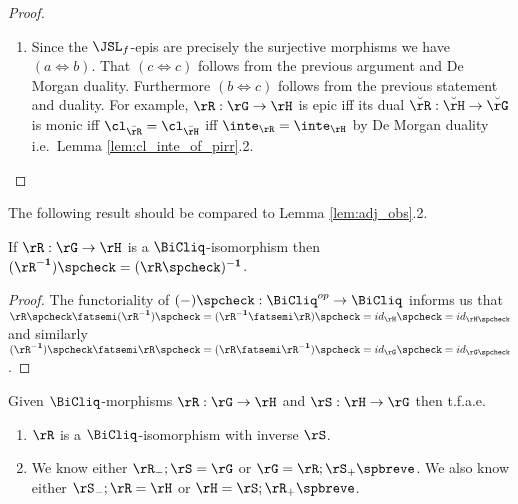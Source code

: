 \documentclass{article}
\begin{document}
\begin{proof}
\begin{enumerate}
\item
Since the $\JSL_f$-epis are precisely the surjective morphisms we have $(a \iff b)$. That $(c \iff c)$ follows from the previous argument and De Morgan duality. Furthermore $(b \iff c)$ follows from the previous statement and duality. For example, $\rR : \rG \to \rH$ is epic iff its dual $\breve{\rR} : \breve{\rH} \to \breve{\rG}$ is monic iff $\cl_{\breve{\rR}} = \cl_{\breve{\rH}}$ iff $\inte_\rR = \inte_\rH$ by De Morgan duality i.e.\ Lemma \ref{lem:cl_inte_of_pirr}.2.
\end{enumerate}
\end{proof}

The following result should be compared to Lemma \ref{lem:adj_obs}.2.

\begin{lemma}
\label{lem:bicliq_iso_adj_inverse_commutes}
If $\rR : \rG \to \rH$ is a $\BiCliq$-isomorphism then $(\rR^{\bf-1})\spcheck = (\rR\spcheck)^{\bf-1}$.
\end{lemma}

\begin{proof}
The functoriality of $(-)\spcheck : \BiCliq^{op} \to \BiCliq$ informs us that $\rR\spcheck \fatsemi (\rR^{\bf-1})\spcheck = (\rR^{\bf-1} \fatsemi \rR)\spcheck = id_\rH\spcheck = id_{\rH\spcheck}$ and similarly $(\rR^{\bf-1})\spcheck \fatsemi \rR\spcheck = (\rR \fatsemi \rR^{\bf-1})\spcheck = id_\rG\spcheck = id_{\rG\spcheck}$.
\end{proof}

\smallskip

\begin{lemma}
\label{lem:bicliq_iso_two_mor}
\item
Given $\BiCliq$-morphisms $\rR : \rG \to \rH$ and $\rS : \rH \to \rG$ then t.f.a.e.\
\begin{enumerate}
\item
$\rR$ is a $\BiCliq$-isomorphism with inverse $\rS$.
\item
We know either $\rR_- ; \rS = \rG$ or $\rG = \rR ; \rS_+\spbreve$.
We also know either $\rS_- ; \rR = \rH$ or  $\rH = \rS ; \rR_+\spbreve$.
\end{enumerate}
\end{lemma}
\end{document}
